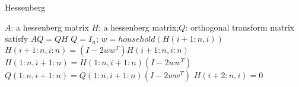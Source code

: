 \renewcommand{\algorithmicrequire}{\textbf{Input:}}
\renewcommand{\algorithmicensure}{\textbf{Output:}}
\begin{breakablealgorithm}
  \caption{Hessenberg}
  \label{alg::Hessenberg}
  \begin{algorithmic}[1]
    \Require $A$: a hessenberg matrix
    \Ensure $H$: a hessenberg matrix;$Q$: orthogonal transform matrix satisfy \(AQ=QH\)
    \State\(Q=I_n\);
        \State\(w=household(H(i+1:n,i))\)
        \State\(H(i+1:n,i:n)=(I-2w{w^T})H(i+1:n,i:n)\)
        \State\(H(1:n,i+1:n)=H(1:n,i+1:n)(I-2w{w^T})\)
        \State\(Q(1:n,i+1:n)=Q(1:n,i+1:n)(I-2w{w^T})\)
        \State\(H(i+2:n,i)=0\)
    \EndFor
  \end{algorithmic}
\end{breakablealgorithm}